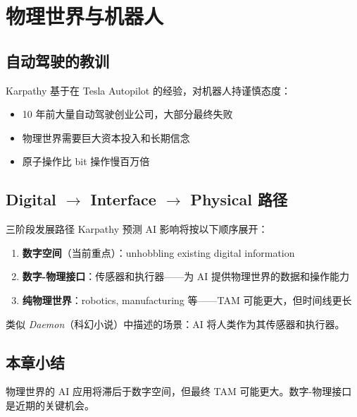 \section{物理世界与机器人}

\subsection{自动驾驶的教训}

Karpathy 基于在 Tesla Autopilot 的经验，对机器人持谨慎态度：
\begin{itemize}
    \item 10 年前大量自动驾驶创业公司，大部分最终失败
    \item 物理世界需要巨大资本投入和长期信念
    \item 原子操作比 bit 操作慢百万倍
\end{itemize}

\subsection{Digital $\rightarrow$ Interface $\rightarrow$ Physical 路径}

\begin{knowledgebox}{三阶段发展路径}
Karpathy 预测 AI 影响将按以下顺序展开：
\begin{enumerate}
    \item \textbf{数字空间}（当前重点）：unhobbling existing digital information
    \item \textbf{数字-物理接口}：传感器和执行器——为 AI 提供物理世界的数据和操作能力
    \item \textbf{纯物理世界}：robotics, manufacturing 等——TAM 可能更大，但时间线更长
\end{enumerate}
类似 \textit{Daemon}（科幻小说）中描述的场景：AI 将人类作为其传感器和执行器。
\end{knowledgebox}

\subsection{本章小结}

物理世界的 AI 应用将滞后于数字空间，但最终 TAM 可能更大。数字-物理接口是近期的关键机会。


